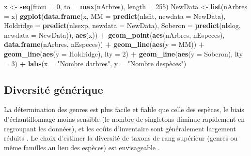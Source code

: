 \documentclass[
  11pt,
  french,
  a4paper,
  extrafontsizes,onecolumn,openright
  ]{memoir}
\newenvironment{Shaded}{\begin{snugshade}}{\end{snugshade}}
\newcommand{\AttributeTok}[1]{\textcolor[rgb]{0.13,0.29,0.53}{#1}}
\newcommand{\DecValTok}[1]{\textcolor[rgb]{0.00,0.00,0.81}{#1}}
\newcommand{\FunctionTok}[1]{\textcolor[rgb]{0.13,0.29,0.53}{\textbf{#1}}}
\newcommand{\NormalTok}[1]{#1}
\newcommand{\OtherTok}[1]{\textcolor[rgb]{0.56,0.35,0.01}{#1}}
\newcommand{\SpecialCharTok}[1]{\textcolor[rgb]{0.81,0.36,0.00}{\textbf{#1}}}
\newcommand{\StringTok}[1]{\textcolor[rgb]{0.31,0.60,0.02}{#1}}
\begin{document}
\begin{Shaded}
\begin{Highlighting}[]
\NormalTok{x }\OtherTok{\textless{}{-}} \FunctionTok{seq}\NormalTok{(}\AttributeTok{from =} \DecValTok{0}\NormalTok{, }\AttributeTok{to =} \FunctionTok{max}\NormalTok{(nArbres), }\AttributeTok{length =} \DecValTok{255}\NormalTok{)}
\NormalTok{NewData }\OtherTok{\textless{}{-}} \FunctionTok{list}\NormalTok{(}\AttributeTok{nArbres =}\NormalTok{ x)}
\FunctionTok{ggplot}\NormalTok{(}\FunctionTok{data.frame}\NormalTok{(x, }
        \AttributeTok{MM =} \FunctionTok{predict}\NormalTok{(nlsfit, }\AttributeTok{newdata =}\NormalTok{ NewData),}
        \AttributeTok{Holdridge =} \FunctionTok{predict}\NormalTok{(nlsexp, }\AttributeTok{newdata =}\NormalTok{ NewData),}
        \AttributeTok{Soberon =} \FunctionTok{predict}\NormalTok{(nlslog, }\AttributeTok{newdata =}\NormalTok{ NewData)), }
    \FunctionTok{aes}\NormalTok{(x)) }\SpecialCharTok{+}
  \FunctionTok{geom\_point}\NormalTok{(}\FunctionTok{aes}\NormalTok{(nArbres, nEspeces), }\FunctionTok{data.frame}\NormalTok{(nArbres, nEspeces)) }\SpecialCharTok{+}
  \FunctionTok{geom\_line}\NormalTok{(}\FunctionTok{aes}\NormalTok{(}\AttributeTok{y =}\NormalTok{ MM)) }\SpecialCharTok{+}
  \FunctionTok{geom\_line}\NormalTok{(}\FunctionTok{aes}\NormalTok{(}\AttributeTok{y =}\NormalTok{ Holdridge), }\AttributeTok{lty =} \DecValTok{2}\NormalTok{) }\SpecialCharTok{+}
  \FunctionTok{geom\_line}\NormalTok{(}\FunctionTok{aes}\NormalTok{(}\AttributeTok{y =}\NormalTok{ Soberon), }\AttributeTok{lty =} \DecValTok{3}\NormalTok{) }\SpecialCharTok{+}
  \FunctionTok{labs}\NormalTok{(}\AttributeTok{x =} \StringTok{"Nombre d\textquotesingle{}arbres"}\NormalTok{, }\AttributeTok{y =} \StringTok{"Nombre d\textquotesingle{}espèces"}\NormalTok{)}
\end{Highlighting}
\end{Shaded}

\normalsize

\subsection{Diversité générique}\label{diversituxe9-guxe9nuxe9rique}

La détermination des genres est plus facile et fiable que celle des espèces, le biais d'échantillonnage moins sensible (le nombre de singletons diminue rapidement en regroupant les données), et les coûts d'inventaire sont généralement largement réduits \autocite{Balmford1996b}.
Le choix d'estimer la diversité de taxons de rang supérieur (genres ou même familles au lieu des espèces) est envisageable \autocite{Williams1994}.
\end{document}
